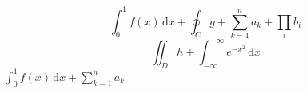 \[ \int_0^1 f(x)\,\mathrm{d}x + \oint_C g + \sum_{k=1}^n a_k + \prod_i b_i \]
\[ \iint_D h + \int_{-\infty}^{+\infty} e^{-x^2}\,\mathrm{d}x \]
$\int_0^1 f(x)\,\mathrm{d}x + \sum_{k=1}^n a_k$
